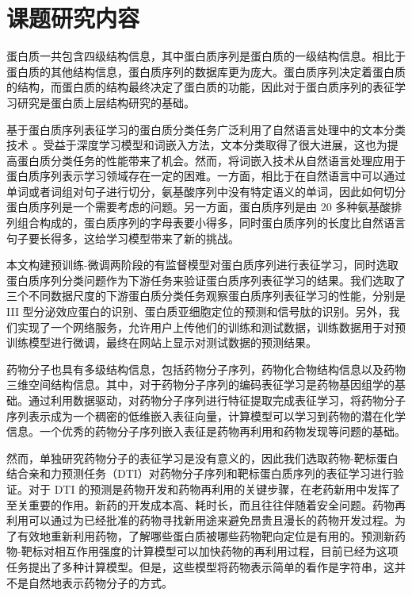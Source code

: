 \section{课题研究内容}
蛋白质一共包含四级结构信息，其中蛋白质序列是蛋白质的一级结构信息。相比于蛋白质的其他结构信息，蛋白质序列的数据库更为庞大。蛋白质序列决定着蛋白质的结构，而蛋白质的结构最终决定了蛋白质的功能，因此对于蛋白质序列的表征学习研究是蛋白质上层结构研究的基础。

基于蛋白质序列表征学习的蛋白质分类任务广泛利用了自然语言处理中的文本分类技术 \cite{ganapathiraju2005computational}。受益于深度学习模型和词嵌入方法，文本分类取得了很大进展，这也为提高蛋白质分类任务的性能带来了机会。然而，将词嵌入技术从自然语言处理应用于蛋白质序列表示学习领域存在一定的困难。一方面，相比于在自然语言中可以通过单词或者词组对句子进行切分，氨基酸序列中没有特定语义的单词，因此如何切分蛋白质序列是一个需要考虑的问题。另一方面，蛋白质序列是由 20 多种氨基酸排列组合构成的，蛋白质序列的字母表要小得多，同时蛋白质序列的长度比自然语言句子要长得多，这给学习模型带来了新的挑战。

本文构建预训练-微调两阶段的有监督模型对蛋白质序列进行表征学习，同时选取蛋白质序列分类问题作为下游任务来验证蛋白质序列表征学习的结果。我们选取了三个不同数据尺度的下游蛋白质分类任务观察蛋白质序列表征学习的性能，分别是 III 型分泌效应蛋白的识别、蛋白质亚细胞定位的预测和信号肽的识别。另外，我们实现了一个网络服务，允许用户上传他们的训练和测试数据，训练数据用于对预训练模型进行微调，最终在网站上显示对测试数据的预测结果。

药物分子也具有多级结构信息，包括药物分子序列，药物化合物结构信息以及药物三维空间结构信息。其中，对于药物分子序列的编码表征学习是药物基因组学的基础。通过利用数据驱动，对药物分子序列进行特征提取完成表征学习，将药物分子序列表示成为一个稠密的低维嵌入表征向量，计算模型可以学习到药物的潜在化学信息。一个优秀的药物分子序列嵌入表征是药物再利用和药物发现等问题的基础。

然而，单独研究药物分子的表征学习是没有意义的，因此我们选取药物-靶标蛋白结合亲和力预测任务（DTI）对药物分子序列和靶标蛋白质序列的表征学习进行验证。对于 DTI 的预测是药物开发和药物再利用的关键步骤，在老药新用中发挥了至关重要的作用。新药的开发成本高、耗时长，而且往往伴随着安全问题。药物再利用可以通过为已经批准的药物寻找新用途来避免昂贵且漫长的药物开发过程。为了有效地重新利用药物，了解哪些蛋白质被哪些药物靶向定位是有用的。预测新药物-靶标对相互作用强度的计算模型可以加快药物的再利用过程，目前已经为这项任务提出了多种计算模型。但是，这些模型将药物表示简单的看作是字符串，这并不是自然地表示药物分子的方式。

